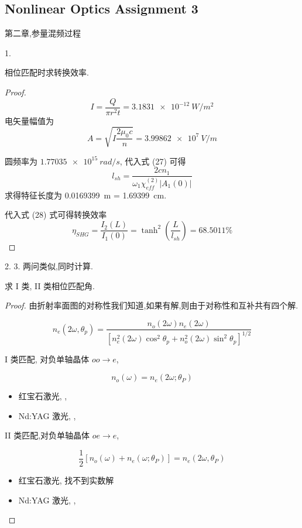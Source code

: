 \subsection{Nonlinear Optics Assignment 3}

第二章,参量混频过程

\begin{exercise}

1. 

相位匹配时求转换效率.
\end{exercise}

\begin{proof}
$$I=\frac{Q}{\pi  r^2 t}= \SI{3.1831e-12}{W/m^2}$$
电矢量幅值为
$$A=\sqrt{ I \frac{ 2 \mu_0 c}{n}}=\SI{3.99862e7}{V/m}$$

圆频率为 $\SI{1.77035e15}{rad/s}$, 代入式 (27) 可得
$$
l_{s h}=\frac{2 c n_{1}}{\omega_{1} \chi_{e f f}^{(2)}\left|A_{1}(0)\right|}
$$
求得特征长度为 \SI{0.0169399}{m} = \SI{1.69399}{cm}.

代入式 (28) 式可得转换效率
$$
\eta_{S H G}=\frac{I_{2}(L)}{I_{1}(0)}=\tanh ^{2}\left(\frac{L}{l_{s h}}\right)=68.5011 \%
$$

\end{proof}

\begin{exercise}

2. 3. 两问类似,同时计算.

求 I 类, II 类相位匹配角.
\end{exercise}

\begin{proof}

由折射率面图的对称性我们知道,如果有解,则由于对称性和互补共有四个解.

$$
n_{e}\left(2 \omega, \theta_{p}\right)=\frac{n_{o}(2 \omega) n_{e}(2 \omega)}{\left[n_{e}^{2}(2 \omega) \cos ^{2} \theta_{p}+n_{o}^{2}(2 \omega) \sin ^{2} \theta_{p}\right]^{1 / 2}}
$$

I 类匹配, 对负单轴晶体 $oo\rightarrow e$,

$$
n_{o}(\omega)=n_{e}\left(2 \omega ; \theta_{P}\right)
$$

\begin{itemize}
    \item 红宝石激光, \degree, \degree
    \item Nd:YAG 激光, \degree,  \degree
\end{itemize}


II 类匹配,对负单轴晶体 $oe\rightarrow e$,

$$
\frac{1}{2}\left[n_{o}(\omega)+n_{e}\left(\omega ; \theta_{P}\right)\right]=n_{e}\left(2 \omega, \theta_{P}\right)
$$

\begin{itemize}
    \item 红宝石激光, 找不到实数解
    \item Nd:YAG 激光, \degree, \degree
\end{itemize}

\end{proof}



